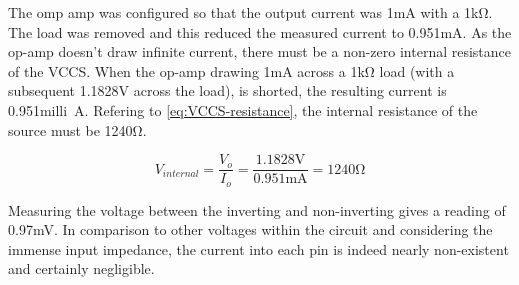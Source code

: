 The omp amp was configured so that the output current was 1\si{\milli\ampere} with a 1\si{\kilo\ohm}.
The load was removed and this reduced the measured current to 0.951\si{\milli\ampere}.
As the op-amp doesn't draw infinite current, there must be a non-zero internal resistance of the VCCS.
When the op-amp drawing 1\si{\milli\ampere} across a 1\si{\kilo\ohm} load (with a subsequent 1.1828\si{\volt} across the load), is shorted, the resulting current is 0.951\si{milli\ampere}.
Refering to \eqref{eq:VCCS-resistance}, the internal resistance of the source must be 1240\si{\ohm}.

\begin{equation}
	V_{internal} = \frac{V_o}{I_o} = \frac{1.1828\si{\volt}}{0.951\si{\milli\ampere}} = 1240\si{\ohm}
	\label{eq:VCCS-resistance}
\end{equation}

Measuring the voltage between the inverting and non-inverting gives a reading of 0.97\si{\milli\volt}.
In comparison to other voltages within the circuit and considering the immense input impedance, the current into each pin is indeed nearly non-existent and certainly negligible.
